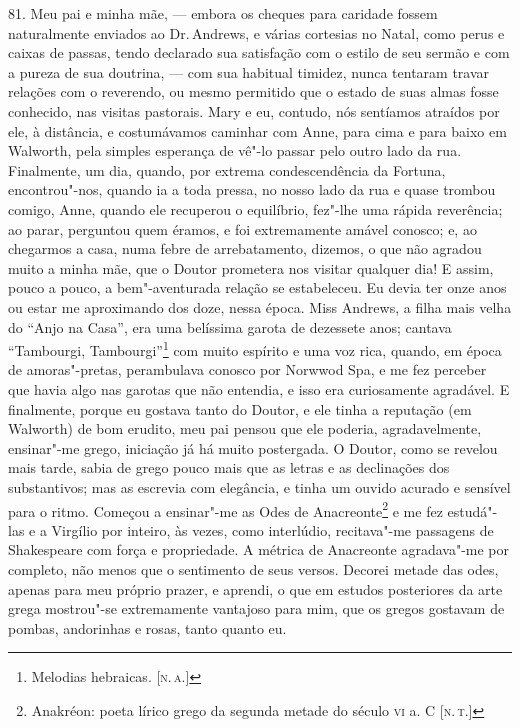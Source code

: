 81. Meu pai e minha mãe, --- embora os cheques para caridade fossem
naturalmente enviados ao Dr.\,Andrews, e várias cortesias no Natal, como
perus e caixas de passas, tendo declarado sua satisfação com o estilo de
seu sermão e com a pureza de sua doutrina, --- com sua habitual timidez,
nunca tentaram travar relações com o reverendo, ou mesmo permitido que o
estado de suas almas fosse conhecido, nas visitas pastorais. Mary e eu,
contudo, nós sentíamos atraídos por ele, à distância, e costumávamos
caminhar com Anne, para cima e para baixo em Walworth, pela simples
esperança de vê"-lo passar pelo outro lado da rua. Finalmente, um dia,
quando, por extrema condescendência da Fortuna, encontrou"-nos, quando ia
a toda pressa, no nosso lado da rua e quase trombou comigo, Anne, quando
ele recuperou o equilíbrio, fez"-lhe uma rápida reverência; ao parar,
perguntou quem éramos, e foi extremamente amável conosco; e, ao
chegarmos a casa, numa febre de arrebatamento, dizemos, o que não
agradou muito a minha mãe, que o Doutor prometera nos visitar qualquer
dia! E assim, pouco a pouco, a bem"-aventurada relação se estabeleceu. Eu
devia ter onze anos ou estar me aproximando dos doze, nessa época. Miss
Andrews, a filha mais velha do ``Anjo na Casa'', era uma belíssima
garota de dezessete anos; cantava ``Tambourgi, Tambourgi''\footnote{Melodias
  hebraicas. {[}\textsc{n.\,a.}{]}} com muito espírito e uma voz rica, quando,
em época de amoras"-pretas, perambulava conosco por Norwwod Spa, e me fez
perceber que havia algo nas garotas que não entendia, e isso era
curiosamente agradável. E finalmente, porque eu gostava tanto do Doutor,
e ele tinha a reputação (em Walworth) de bom erudito, meu pai pensou que
ele poderia, agradavelmente, ensinar"-me grego, iniciação já há muito
postergada. O Doutor, como se revelou mais tarde, sabia de grego pouco
mais que as letras e as declinações dos substantivos; mas as escrevia
com elegância, e tinha um ouvido acurado e sensível para o ritmo.
Começou a ensinar"-me as Odes de Anacreonte\footnote{Anakréon: poeta
  lírico grego da segunda metade do século \textsc{vi} a. C {[}\textsc{n.\,t.}{]}} e me
fez estudá"-las e a Virgílio por inteiro, às vezes, como interlúdio,
recitava"-me passagens de Shakespeare com força e propriedade. A métrica
de Anacreonte agradava"-me por completo, não menos que o sentimento de
seus versos. Decorei metade das odes, apenas para meu próprio prazer, e
aprendi, o que em estudos posteriores da arte grega mostrou"-se
extremamente vantajoso para mim, que os gregos gostavam de pombas,
andorinhas e rosas, tanto quanto eu.

